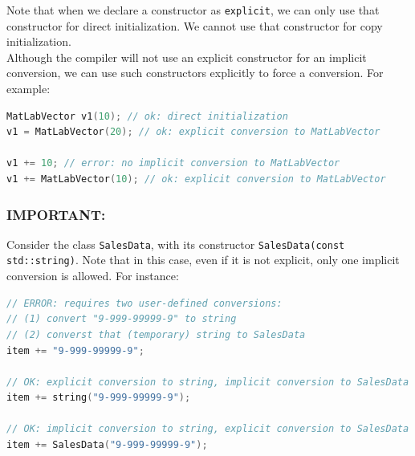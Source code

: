 Note that when we declare a constructor as \texttt{explicit}, we can only use that constructor
for direct initialization. We cannot use that constructor for copy initialization.\\

Although the compiler will not use an explicit constructor for an implicit conversion, we can
use such constructors explicitly to force a conversion. For example:\\

\begin{lstlisting}[language=C++]
MatLabVector v1(10); // ok: direct initialization
v1 = MatLabVector(20); // ok: explicit conversion to MatLabVector

v1 += 10; // error: no implicit conversion to MatLabVector
v1 += MatLabVector(10); // ok: explicit conversion to MatLabVector
\end{lstlisting}

\subsubsection{IMPORTANT:}

Consider the class \texttt{SalesData}, with its constructor \texttt{SalesData(const std::string)}.
Note that in this case, even if it is not explicit, only one implicit conversion is allowed.
For instance:\\

\begin{lstlisting}[language=C++]
// ERROR: requires two user-defined conversions:
// (1) convert "9-999-99999-9" to string
// (2) converst that (temporary) string to SalesData
item += "9-999-99999-9";

// OK: explicit conversion to string, implicit conversion to SalesData
item += string("9-999-99999-9");

// OK: implicit conversion to string, explicit conversion to SalesData
item += SalesData("9-999-99999-9");
\end{lstlisting}